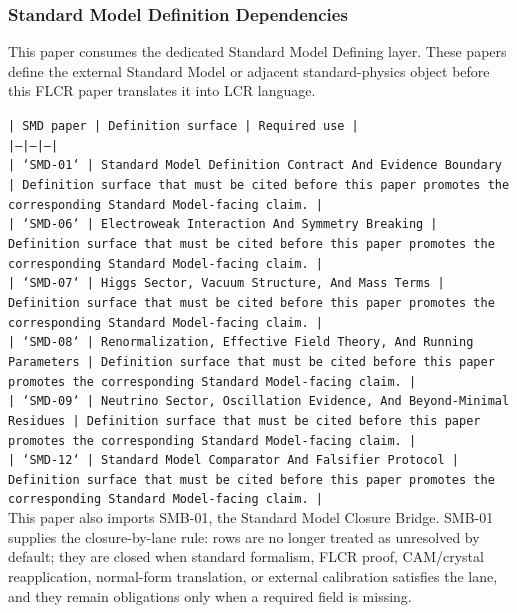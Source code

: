 \documentclass[11pt]{article}
\begin{document}
\subsubsection*{Standard Model Definition Dependencies}

This paper consumes the dedicated Standard Model Defining layer. These papers define the external Standard Model or adjacent standard-physics object before this FLCR paper translates it into LCR language.

\noindent\texttt{| SMD paper | Definition surface | Required use |}\\
\noindent\texttt{|---|---|---|}\\
\noindent\texttt{| `SMD-01` | Standard Model Definition Contract And Evidence Boundary | Definition surface that must be cited before this paper promotes the corresponding Standard Model-facing claim. |}\\
\noindent\texttt{| `SMD-06` | Electroweak Interaction And Symmetry Breaking | Definition surface that must be cited before this paper promotes the corresponding Standard Model-facing claim. |}\\
\noindent\texttt{| `SMD-07` | Higgs Sector, Vacuum Structure, And Mass Terms | Definition surface that must be cited before this paper promotes the corresponding Standard Model-facing claim. |}\\
\noindent\texttt{| `SMD-08` | Renormalization, Effective Field Theory, And Running Parameters | Definition surface that must be cited before this paper promotes the corresponding Standard Model-facing claim. |}\\
\noindent\texttt{| `SMD-09` | Neutrino Sector, Oscillation Evidence, And Beyond-Minimal Residues | Definition surface that must be cited before this paper promotes the corresponding Standard Model-facing claim. |}\\
\noindent\texttt{| `SMD-12` | Standard Model Comparator And Falsifier Protocol | Definition surface that must be cited before this paper promotes the corresponding Standard Model-facing claim. |}\\

This paper also imports SMB-01, the Standard Model Closure Bridge. SMB-01 supplies the closure-by-lane rule: rows are no longer treated as unresolved by default; they are closed when standard formalism, FLCR proof, CAM/crystal reapplication, normal-form translation, or external calibration satisfies the lane, and they remain obligations only when a required field is missing.
\end{document}
